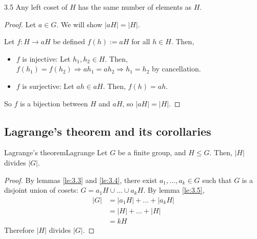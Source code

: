 \documentclass[12pt]{article}
\begin{document}
	\begin{mylem}{}{3.5}
		Any left coset of $H$ has the same number of elements as $H$.
		\begin{proof}
			Let $a\in G$. We will show $|aH|=|H|$.
			
			Let $f:H\to aH$ be defined $f(h):=aH$ for all $h\in H$. Then,
			\begin{itemize}
				\item $f$ is injective: Let $h_1, h_2\in H$. Then, $f(h_1)=f(h_2)\Longrightarrow ah_1=ah_2\Longrightarrow h_1=h_2$ by cancellation.
				\item $f$ is surjective: Let $ah\in aH$. Then, $f(h)=ah$.
			\end{itemize}
			So $f$ is a bijection between $H$ and $aH$, so $|aH|=|H|$.
		\end{proof}		
	\end{mylem}
	
	\subsection{Lagrange's theorem and its corollaries}	
	\begin{mythm}{Lagrange's theorem}{Lagrange}
		Let $G$ be a finite group, and $H\leq G$. Then, $|H|$ divides $|G|$.
		\begin{proof}
			By lemmas \ref{le:3.3} and \ref{le:3.4}, there exist $a_1, \dots, a_k\in G$ such that $G$ is a disjoint union of cosets: $G=a_1H\cup\dots\cup a_kH$. By lemma \ref{le:3.5},
			\begin{align*}
				|G|&=|a_1H|+\dots+|a_kH|\\
				&=|H|+\dots+|H|\\
				&=kH
			\end{align*}
			Therefore $|H|$ divides $|G|$.
		\end{proof}
	\end{mythm}
	
\end{document}
